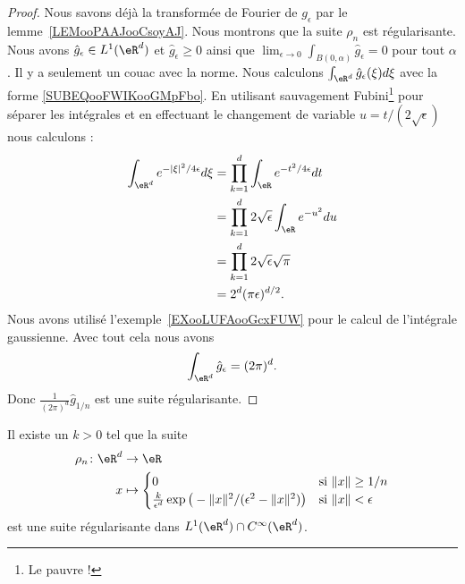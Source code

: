 \begin{proof}
	Nous savons déjà la transformée de Fourier de \( g_{\epsilon}\) par le lemme~\ref{LEMooPAAJooCsoyAJ}. Nous montrons que la suite \( \rho_n\) est régularisante. Nous avons \( \hat g_{\epsilon}\in L^1(\eR^d)\) et \( \hat g_{\epsilon}\geq 0\) ainsi que \( \lim_{\epsilon\to 0}\int_{B(0,\alpha)}\hat  g_{\epsilon}=0\) pour tout \( \alpha\). Il y a seulement un couac avec la norme. Nous calculons \( \int_{\eR^d}\hat g_{\epsilon}(\xi)d\xi\) avec la forme \eqref{SUBEQooFWIKooGMpFbo}. En utilisant sauvagement Fubini\footnote{Le pauvre !} pour séparer les intégrales et en effectuant le changement de variable \( u=t/(2\sqrt{ \epsilon })\) nous calculons :
	\begin{subequations}
		\begin{align}
			\int_{\eR^d} e^{-| \xi |^2/4\epsilon}d\xi & =\prod_{k=1}^d\int_{\eR} e^{-t^2/4\epsilon}dt         \\
			                                          & =\prod_{k=1}^d2\sqrt{ \epsilon }\int_{\eR} e^{-u^2}du \\
			                                          & =\prod_{k=1}^d2\sqrt{ \epsilon }\sqrt{ \pi }          \\
			                                          & =2^d(\pi\epsilon)^{d/2}.
		\end{align}
	\end{subequations}
	Nous avons utilisé l'exemple~\ref{EXooLUFAooGcxFUW} pour le calcul de l'intégrale gaussienne. Avec tout cela nous avons
	\begin{equation}
		\int_{\eR^d}\hat g_{\epsilon}=(2\pi)^d.
	\end{equation}
	Donc \( \frac{1}{ (2\pi)^d }\hat g_{1/n}\) est une suite régularisante.
\end{proof}

\begin{proposition}	\label{PROPooFTGEooAouzOO}
	Il existe un \( k>0\) tel que la suite
	\begin{equation}
		\begin{aligned}
			\rho_n\colon \eR^d & \to \eR                                                                                                         \\
			x                  & \mapsto \begin{cases}
				                             0                                                                         & \text{si } \| x \|\geq 1/n  \\
				                             \frac{ k }{ \epsilon^d }\exp\big( -\| x \|^2/(\epsilon^2-\| x \|^2) \big) & \text{si } \| x \|<\epsilon
			                             \end{cases}
		\end{aligned}
	\end{equation}
	est une suite régularisante dans \( L^1(\eR^d)\cap C^{\infty}(\eR^d)\).
\end{proposition}

